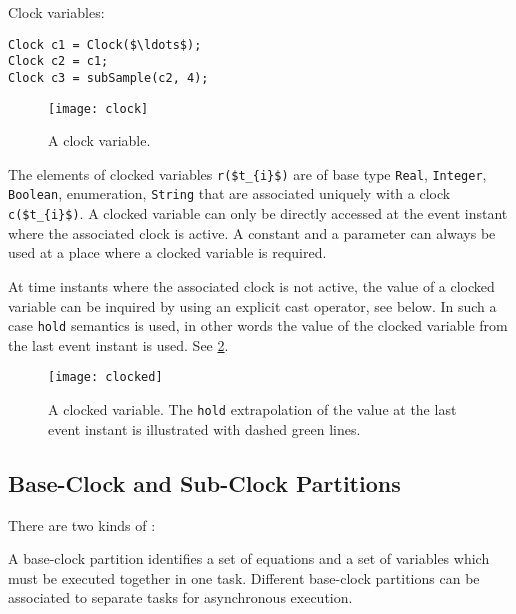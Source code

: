 \begin{example}
Clock variables:
\begin{lstlisting}[language=modelica]
Clock c1 = Clock($\ldots$);
Clock c2 = c1;
Clock c3 = subSample(c2, 4);
\end{lstlisting}
\end{example}

\begin{figure}[H]
  \begin{center}
    \texttt{[image: clock]}
  \end{center}
  \caption{A clock variable.}\label{fig:clock-variable}
\end{figure}

\begin{definition}
The elements of clocked variables \lstinline!r($t_{i}$)! are of base type \lstinline!Real!, \lstinline!Integer!, \lstinline!Boolean!, enumeration, \lstinline!String! that are associated uniquely with
a clock \lstinline!c($t_{i}$)!.  A clocked variable can only be directly accessed at the event instant where the associated clock is active.  A constant and a parameter can always be used at a place
where a clocked variable is required.

At time instants where the associated clock is not active, the value of a clocked variable can be inquired by using an explicit cast operator, see below.  In such a case \lstinline!hold! semantics is
used, in other words the value of the clocked variable from the last event instant is used.  See \cref{fig:clocked-variable}.
\end{definition}

\begin{figure}[H]
  \begin{center}
    \texttt{[image: clocked]}
  \end{center}
  \caption{A clocked variable.  The \lstinline!hold! extrapolation of the value at the last event instant is illustrated with dashed green lines.}\label{fig:clocked-variable}
\end{figure}

\subsection{Base-Clock and Sub-Clock Partitions}\label{base-clock-and-sub-clock-partitions}

There are two kinds of :

\begin{definition}
A base-clock partition identifies a set of equations and a set of variables which must be executed together in one task.  Different base-clock partitions can be associated to separate tasks for
asynchronous execution.
\end{definition}

